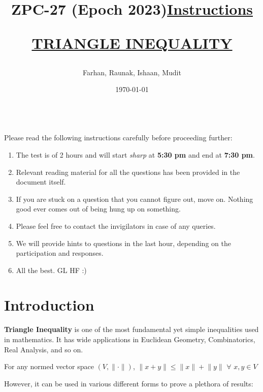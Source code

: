 \documentclass[12pt]{article}
\title{ZPC-27 (Epoch 2023)}
\author{Farhan, Raunak, Ishaan, Mudit}
\date{\today}
\theoremstyle{definition}
\begin{document}
\maketitle
\title{\textbf{\underline{\fontsize{18}{12}\selectfont Instructions}}}\\
Please read the following instructions carefully before proceeding further:\\
\begin{enumerate}
\item The test is of 2 hours and will start \textit{sharp} at \textbf{5:30 pm} and end at \textbf{7:30 pm}.
\item Relevant reading material for all the questions has been provided in the document itself.
\item If you are stuck on a question that you cannot figure out, move on. Nothing good ever comes out of being hung up on something.
\item Please feel free to contact the invigilators in case of any queries.
\item We will provide hints to questions in the last hour, depending on the participation and responses.
\item All the best. GL HF :)\\
\end{enumerate}
\bigskip
\maketitle
\newpage
\title{\begin{center}\textbf{\underline{\fontsize{16}{12}\selectfont TRIANGLE INEQUALITY}}\end{center}}
\section{Introduction}
\textbf{Triangle Inequality} is one of the most fundamental yet simple inequalities used in mathematics. It has wide applications in Euclidean Geometry, Combinatorics, Real Analysis, and so on.

For any normed vector space $(V,\lVert \cdot \rVert)$, $\lVert x+y \rVert \leq \lVert x \rVert + \lVert y \rVert$ $\forall$ $x,y\in V$

However, it can be used in various different forms to prove a plethora of results:
\end{document}
